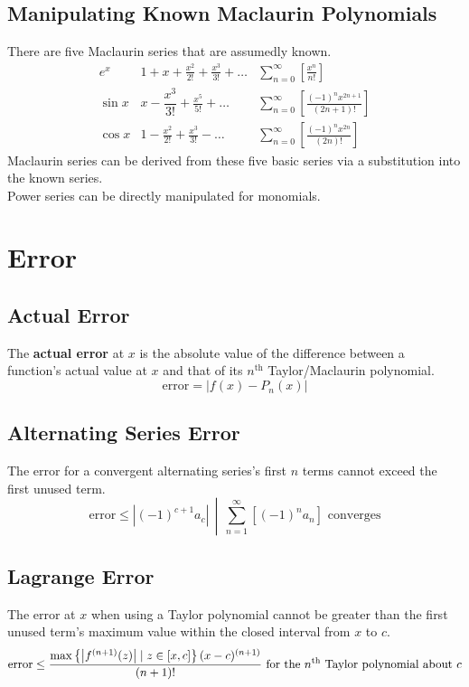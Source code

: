 \documentclass[../AP_Calculus]{subfiles}
\begin{document}
		\subsection*{Manipulating Known Maclaurin Polynomials}
			There are five Maclaurin series that are assumedly known.
			\begingroup
				\renewcommand{\arraystretch}{2}
				\[\begin{array}{l|l|l}
					\displaystyle e^x &\displaystyle 1 + x + \frac{x^2}{2!} + \frac{x^3}{3!} + \ldots &\displaystyle \sum_{n = 0}^\infty\left[\frac{x^n}{n!}\right] \\
					\displaystyle \sin x &\displaystyle x - \dfrac{x^3}{3!} + \frac{x^5}{5!} + \ldots &\displaystyle \sum_{n = 0}^\infty\left[\frac{(-1)^nx^{2n + 1}}{(2n + 1)!}\right] \\
					\displaystyle \cos x &\displaystyle 1 - \frac{x^2}{2!} + \frac{x^3}{3!} - \ldots &\displaystyle \sum_{n = 0}^\infty\left[\frac{(-1)^nx^{2n}}{(2n)!}\right]
				\end{array}\]
			\endgroup
			Maclaurin series can be derived from these five basic series via a substitution into the known series. \\
			Power series can be directly manipulated for monomials.
	\section{Error}
		\subsection{Actual Error}
			The \textbf{actual error} at $x$ is the absolute value of the difference between a function's actual value at $x$ and that of its $n^{\mathrm{th}}$ Taylor/Maclaurin polynomial.
			\[\mathrm{error} = |f(x) - P_n(x)|\]
		\subsection{Alternating Series Error}
			The error for a convergent alternating series's first $n$ terms cannot exceed the first unused term.
			\[\left.\mathrm{error} \le \left|(-1)^{c + 1}a_c\right|\, \middle|\, \sum_{n = 1}^\infty\left[(-1)^na_n\right] \text{ converges}\right.\]
		\subsection{Lagrange Error}
			The error at $x$ when using a Taylor polynomial cannot be greater than the first unused term's maximum value within the closed interval from $x$ to $c$.
			\[\mathrm{error} \le \frac{\mathrm{max}\left\{\left|f^{(n + 1)}(z)\right| \mid z \in [x, c]\right\}(x - c)^{(n + 1)}}{(n + 1)!} \text{ for the \(n^{\mathrm{th}}\) Taylor polynomial about $c$}\]
\end{document}
